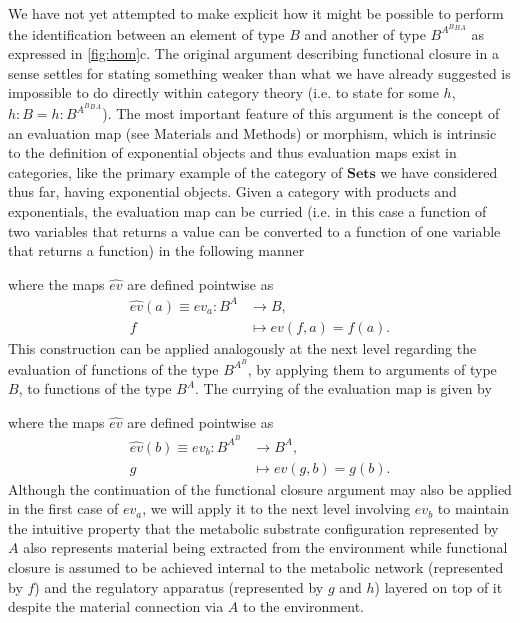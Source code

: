 We have not yet attempted to make explicit how it might be possible to perform the identification between an element of type $B$ and another of type $B^{A^B{^B{^A}}}$ as expressed in \ref{fig:hom}c. The original argument describing functional closure in a sense settles for stating something weaker than what we have already suggested is impossible to do directly within category theory (i.e. to state for some $h$, $h:B = h:B^{A^B{^B{^A}}}$). The most important feature of this argument is the concept of an evaluation map (see Materials and Methods) or morphism, which is intrinsic to the definition of exponential objects and thus evaluation maps exist in categories, like the primary example of the category of $\mathbf{Sets}$ we have considered thus far, having exponential objects. Given a category with products and exponentials, the evaluation map can be curried (i.e. in this case a function of two variables that returns a value can be converted to a function of one variable that returns a function) in the following manner
\begin{prooftree}
\end{prooftree}
where the maps $\hat{ev}$ are defined pointwise as
\begin{align*}
\hat{ev}(a) \equiv ev_a \colon B^A &\longrightarrow B,\\
f &\longmapsto ev(f,a) = f(a).
\end{align*}
This construction can be applied analogously at the next level regarding the evaluation of functions of the type $B^{A^B}$, by applying them to arguments of type $B$, to functions of the type $B^A$. The currying of the evaluation map is given by
\begin{prooftree}
\end{prooftree}
where the maps $\hat{ev}$ are defined pointwise as
\begin{align*}
\hat{ev}(b) \equiv ev_b \colon B^{A^B} &\longrightarrow B^A,\\
g &\longmapsto ev(g,b) = g(b).
\end{align*}
Although the continuation of the functional closure argument may also be applied in the first case of $ev_a$, we will apply it to the next level involving $ev_b$ to maintain the intuitive property that the metabolic substrate configuration represented by $A$ also represents material being extracted from the environment while functional closure is assumed to be achieved internal to the metabolic network (represented by $f$) and the regulatory apparatus (represented by $g$ and $h$) layered on top of it despite the material connection via $A$ to the environment.

